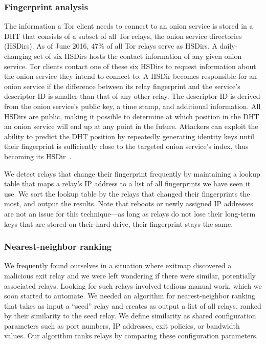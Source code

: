 \subsubsection{Fingerprint analysis}
\label{sec:fingerprint-analysis}
The information a Tor client needs to connect to an onion service is stored in a
DHT that consists of a subset of all Tor relays, the onion service directories
(HSDirs).  As of June 2016, 47\% of all Tor relays serve as HSDirs.  A
daily-changing set of six HSDirs hosts the contact information of any given
onion service.  Tor clients contact one of these six HSDirs to request
information about the onion service they intend to connect to.  A HSDir becomes
responsible for an onion service if the difference between its relay fingerprint
and the service's descriptor ID is smaller than that of any other relay.  The
descriptor ID is derived from the onion service's public key, a time stamp, and
additional information.
All HSDirs are public, making it possible to determine at which position in the
DHT an onion service will end up at any point in the future.  Attackers can
exploit the ability to predict the DHT position by repeatedly generating
identity keys until their fingerprint is sufficiently close to the targeted
onion service's index, thus becoming its HSDir~\cite[\S~V.A]{Biryukov2013a}.

We detect relays that change their fingerprint frequently by maintaining a
lookup table that maps a relay's IP address to a list of all fingerprints we
have seen it use.  We sort the lookup table by the relays that changed their
fingerprints the most, and output the results.  Note that reboots or newly
assigned IP addresses are not an issue for this technique---as long as relays
do not lose their long-term keys that are stored on their hard drive, their
fingerprint stays the same.

\subsubsection{Nearest-neighbor ranking}
\label{sec:nearest-neighbor}
We frequently found ourselves in a situation where exitmap discovered a
malicious exit relay and we were left wondering if there were similar,
potentially associated relays.  Looking for such relays involved tedious manual
work, which we soon started to automate.  We needed an algorithm for
nearest-neighbor ranking that takes as input a ``seed'' relay and creates as
output a list of all relays, ranked by their similarity to the seed relay.  We
define similarity as shared configuration parameters such as port numbers, IP
addresses, exit policies, or bandwidth values.  Our algorithm ranks relays by
comparing these configuration parameters.

